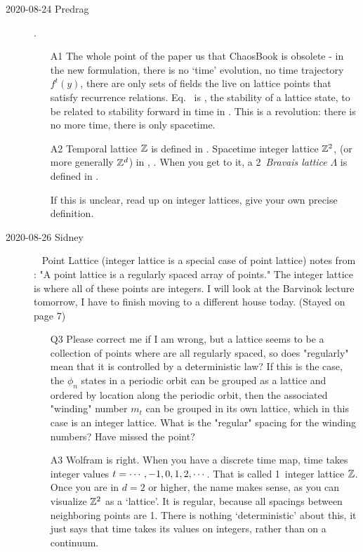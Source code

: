 \begin{description}
\item[2020-08-24 Predrag].

\begin{itemize}
  \item[A1]
The whole point of the paper us that ChaosBook is obsolete - in the new
formulation, there is no `time' evolution, no time trajectory $f^t(y)$,
there are only sets of fields the live on lattice points that satisfy
recurrence relations. Eq.~ is \emph{\jacobianOrb}, the
stability of a lattice state, to be related to stability forward in time
in . This is a revolution: there is no more time, there
is only spacetime.
  \item[A2]
Temporal lattice $\mathbb{Z}$ is defined in . Spacetime
integer lattice $\mathbb{Z}^2$, (or more generally $\mathbb{Z}^d$) in
, .
When you get to it, a 2\dmn\ \emph{Bravais lattice} $\Lambda$ is defined
in .

If this is unclear, read up on integer lattices, give your own precise definition.
\end{itemize}

\item[2020-08-26 Sidney]~
Point Lattice (integer lattice is a special case of point
lattice) notes from
: "A point
lattice is a regularly spaced array of points." The integer lattice is
where all of these points are integers. I will look at the Barvinok
lecture tomorrow, I have to finish moving to a different house today.
(Stayed on page 7)

\begin{itemize}
	\item[Q3]
Please correct me if I am wrong, but a lattice seems to be a collection of points where are all regularly spaced, so does "regularly" mean that it is controlled by a deterministic law? If this is the case, the $\phi_n$ states in a periodic orbit can be grouped as a lattice and ordered by location along the periodic orbit, then the associated "winding" number $m_t$ can be grouped in its own lattice, which in this case is an integer lattice. What is the "regular" spacing for the winding numbers? Have missed the point?
\end{itemize}

\begin{itemize}
  \item[A3]
Wolfram is right. When you have a discrete time map, time takes integer
values $t=\cdots,-1,0,1,2,\cdots$. That is called 1\dmn\ integer lattice
$\mathbb{Z}$. Once you are in $d=2$ or higher, the name makes sense, as
you can visualize $\mathbb{Z}^2$ as a `lattice'. It is regular, because all spacings
between neighboring points are 1. There is nothing `deterministic' about
this, it just says that time takes its values on integers, rather than on a continuum.


\end{itemize}
\end{description}
